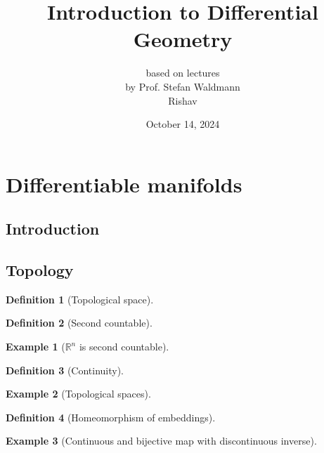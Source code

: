 \documentclass{article}
\title{Introduction to Differential Geometry}
\author{based on lectures\\by Prof. Stefan Waldmann\vspace{1.5in}\\Rishav}
\date{October 14, 2024}
\begin{document}
\maketitle

\theoremstyle{definition}
\newtheorem{definition}{Definition}[section]
\newtheorem{example}{Example}[section]
\newtheorem{theorem}{Theorem}[section]
\newtheorem{lemma}{Lemma}[section]
\newtheorem{remark}{Remark}[section]
\newtheorem{proposition}{Proposition}[section]
\newtheorem{corollary}{Corollary}[section]

\newpage
\tableofcontents
\newpage

\section{Differentiable manifolds}

\subsection{Introduction}

\subsection{Topology}

\begin{definition}[Topological space]
\end{definition}

\begin{definition}[Second countable]
\end{definition}

\begin{example}[$\mathbb{R}^{n}$ is second countable]
\end{example}

\begin{definition}[Continuity]
\end{definition}

\begin{example}[Topological spaces]
\end{example}

\begin{definition}[Homeomorphism of embeddings]
\end{definition}

\begin{example}[Continuous and bijective map with discontinuous inverse]
\end{example}
\end{document}
